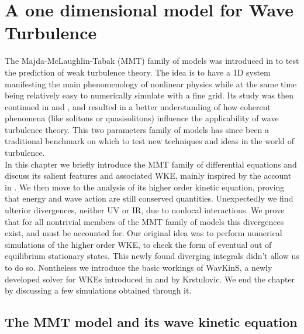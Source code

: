 

\newpage
\vphantom{}
\section{A one dimensional model for Wave Turbulence}
    The Majda-McLaughlin-Tabak (MMT) family of models was introduced in \cite{Majda1997} to test the prediction of weak turbulence theory. The idea is to have a 1D system manifesting
    the main phenomenology of nonlinear physics while at the same time being relatively easy to numerically simulate with a fine grid. Its study was then continued in
    \cite{Cai2001} and \cite{Zakharov2001}, and resulted in a better understanding of how coherent phenomena (like solitons or quasisolitons) influence the applicability 
    of wave turbulence theory. This two parameters family of models has since been a traditional benchmark on which to test new techniques and ideas in the world of turbulence. \\
    In this chapter we briefly introduce the MMT family of differential equations and discuss its salient features and associated WKE, mainly inspired by the account in 
    \cite{ZAKHAROV2004}. We then 
    move to the analysis of its higher order kinetic equation, proving that energy and wave action are still conserved quantities. Unexpectedly  we find
    ulterior divergences, neither UV or IR, due to nonlocal interactions. We prove that for all nontrivial members of the MMT family of
    models this divergences exist, and must be accounted for. Our original idea was to perform numerical simulations of the higher order WKE, to check the form of eventual
    out of equilibrium stationary states. This newly found diverging integrals didn't allow us to do so. Nontheless we introduce the basic workings of WavKinS,
    a newly developed solver for WKEs introduced in \cite{Giorgio1} and \cite{Giorgio2} by Krstulovic. We end the chapter by discussing a few simulations obtained 
    through it. \\  
    \subsection{The MMT model and its wave kinetic equation}

